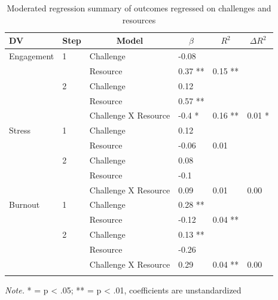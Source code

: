 \documentclass[
  man]{apa7}
\begin{document}
\begin{table}[tbp]

\begin{center}
\begin{threeparttable}

\caption{\label{tab:chal-resource-table}Moderated regression summary of outcomes regressed on challenges and resources}

\begin{tabular}{llllll}
\toprule
DV & \multicolumn{1}{c}{Step} & \multicolumn{1}{c}{Model} & \multicolumn{1}{c}{$\beta$} & \multicolumn{1}{c}{$R^2$} & \multicolumn{1}{c}{$\Delta R^2$}\\
\midrule
Engagement & 1 & Challenge & -0.08 &  & \\
 &  & Resource & 0.37 ** & 0.15 ** & \\
 & 2 & Challenge & 0.12 &  & \\
 &  & Resource & 0.57 ** &  & \\
 &  & Challenge X Resource & -0.4 * & 0.16 ** & 0.01 *\\
Stress & 1 & Challenge & 0.12 &  & \\
 &  & Resource & -0.06 & 0.01 & \\
 & 2 & Challenge & 0.08 &  & \\
 &  & Resource & -0.1 &  & \\
 &  & Challenge X Resource & 0.09 & 0.01 & 0.00\\
Burnout & 1 & Challenge & 0.28 ** &  & \\
 &  & Resource & -0.12 & 0.04 ** & \\
 & 2 & Challenge & 0.13 ** &  & \\
 &  & Resource & -0.26 &  & \\
 &  & Challenge X Resource & 0.29 & 0.04 ** & 0.00\\
\bottomrule
\addlinespace
\end{tabular}

\begin{tablenotes}[para]
\normalsize{\textit{Note.} * = p < .05; ** = p < .01, coefficients are unstandardized}
\end{tablenotes}

\end{threeparttable}
\end{center}

\end{table}
\end{document}
